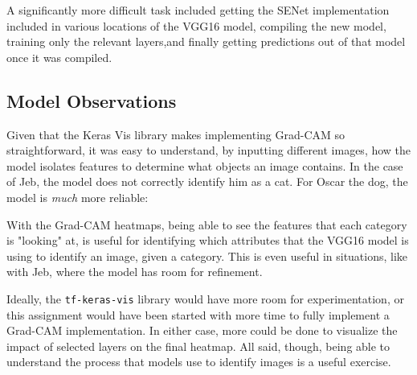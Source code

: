 \documentclass{article}
\begin{document}
\par A significantly more difficult task included getting the SENet implementation included in various locations of the VGG16 model, compiling the new model, training only the relevant layers,and finally getting predictions out of that model once it was compiled.

\subsection{Model Observations}
\par Given that the Keras Vis library makes implementing Grad-CAM so straightforward, it was easy to understand, by inputting different images, how the model isolates features to determine what objects an image contains.
In the case of Jeb, the model does not correctly identify him as a cat.
For Oscar the dog, the model is \textit{much} more reliable:





\par With the Grad-CAM heatmaps, being able to see the features that each category is "looking" at, is useful for identifying which attributes that the VGG16 model is using to identify an image, given a category.
This is even useful in situations, like with Jeb, where the model has room for refinement.

\par Ideally, the \lstinline{tf-keras-vis} library would have more room for experimentation, or this assignment would have been started with more time to fully implement a Grad-CAM implementation.
In either case, more could be done to visualize the impact of selected layers on the final heatmap.
All said, though, being able to understand the process that models use to identify images is a useful exercise.
\end{document}
